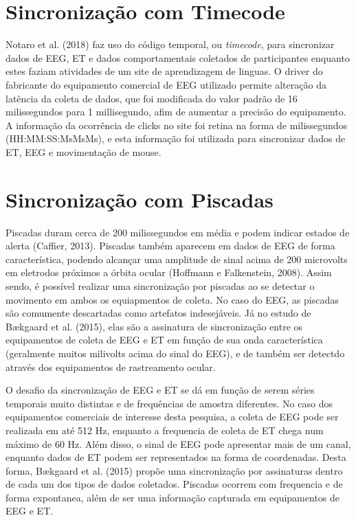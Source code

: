 \section{Sincronização com Timecode}
Notaro et al. (2018) faz uso do código temporal, ou \textit{timecode}, para sincronizar dados de EEG, ET e dados comportamentais 
coletados de participantes enquanto estes faziam atividades de um site de aprendizagem de linguas. O driver
do fabricante do equipamento comercial de EEG utilizado permite alteração da latência da coleta de dados, que
foi modificada do valor padrão de 16 milissegundos para 1 millisegundo, afim de aumentar a precisão do equipamento.
A informação da ocorrência de clicks no site foi retina na forma de milissegundos (HH:MM:SS:MsMsMs), e esta informação foi utilizada 
para sincronizar dados de ET, EEG e movimentação de mouse. 

\section{Sincronização com Piscadas}
Piscadas duram cerca de 200 milissegundos em média e podem indicar estados de alerta (Caffier, 2013). Piscadas também aparecem 
em dados de EEG de forma característica, podendo alcançar uma amplitude de sinal acima de 200 microvolts em eletrodos próximos a órbita ocular (Hoffmann e Falkenstein, 2008). Assim sendo, é possível realizar uma sincronização por piscadas ao se detectar 
o movimento em ambos os equiapmentos de coleta. No caso do EEG, as piscadas são comumente descartadas como artefatos indesejáveis. Já no estudo de 
Bækgaard et al. (2015), elas são a assinatura de sincronização entre os equipamentos de coleta de EEG e ET em função de sua onda característica (geralmente muitos milivolts acima do sinal do EEG), e de também 
ser detectdo através dos equipamentos de rastreamento ocular.

O desafio da sincronização de EEG e ET se dá em função de serem séries temporais muito distintas e 
de frequências de amostra diferentes. No caso dos equipamentos comerciais de interesse desta pesquisa,
a coleta de EEG pode ser realizada em até 512 Hz, enquanto a frequencia de coleta de ET chega num máximo de 60 Hz. 
Além disso, o sinal de EEG pode apresentar mais de um canal, enquanto dados de ET podem ser representados
na forma de coordenadas. Desta forma, Bækgaard et al. (2015) propõe uma sincronização por assinaturas dentro de cada um dos tipos de dados
coletados. Piscadas ocorrem com frequencia e de forma expontanea, além de ser uma informação capturada em 
equipamentos de EEG e ET.




